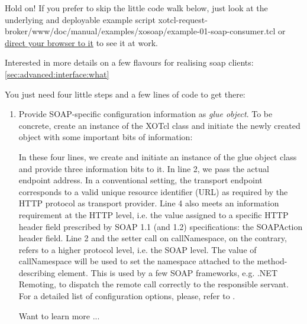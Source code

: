 \begin{hints}
\item Hold on! If you prefer to skip the little code walk below, just look at the underlying and deployable 
example script xotcl-request-broker/www/doc/manual/examples/xosoap/example-01-soap-consumer.tcl 
or \href{http://openacs-dotlrn.wu-wien.ac.at/request-broker/doc/manual/examples/xosoap/example-01-
soap-consumer.tcl}{direct your browser to it} to see it at work.
\item Interested in more details on a few flavours for realising soap clients: \ref{sec:advanced:interface:what}
\end{hints}
You just need four little steps and a few lines of code to get there:
\begin{enumerate}
\item Provide SOAP-specific configuration information as \emph{glue object}. To be concrete, create an 
instance of the XOTcl class  and initiate the newly created object with some important bits of information:
\lstset{breaklines=true,numbers=left,basicstyle=\footnotesize,frame=single}

In these four lines, we create and initiate an instance of the glue object class and provide three 
information bits to it. In line 2, we pass the actual endpoint address. In a conventional setting, the 
transport endpoint corresponds to a valid unique resource identifier (URL) as required by the HTTP 
protocol as transport provider. Line 4 also meets an information requirement at the HTTP level, i.e. the 
value assigned to a specific HTTP header field prescribed by SOAP 1.1 \cite{w3c:2000} (and 1.2) specifications: the 
SOAPAction header field. Line 2 and the setter call on callNamespace, on the contrary, refers to a higher 
protocol level, i.e. the SOAP level. The value of callNamespace will be used to set the namespace 
attached to the method-describing element. This is used by a few SOAP frameworks, e.g. .NET 
Remoting, to dispatch the remote call correctly to the responsible servant. For a detailed list of 
configuration options, please, refer to .

Want to learn more ...


\end{enumerate}
